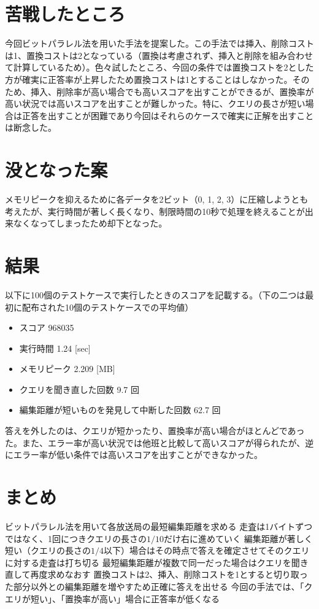 \documentclass[dvipdfmx]{jsarticle}
\begin{document}
\section{苦戦したところ}

今回ビットパラレル法を用いた手法を提案した。この手法では挿入、削除コストは1、置換コストは2となっている（置換は考慮されず、挿入と削除を組み合わせて計算しているため）。色々試したところ、今回の条件では置換コストを2とした方が確実に正答率が上昇したため置換コストは1とすることはしなかった。そのため、挿入、削除率が高い場合でも高いスコアを出すことができるが、置換率が高い状況では高いスコアを出すことが難しかった。特に、クエリの長さが短い場合は正答を出すことが困難であり今回はそれらのケースで確実に正解を出すことは断念した。

\section{没となった案}

メモリピークを抑えるために各データを2ビット（0, 1, 2, 3）に圧縮しようとも考えたが、実行時間が著しく長くなり、制限時間の10秒で処理を終えることが出来なくなってしまったため却下となった。

\section{結果}

以下に100個のテストケースで実行したときのスコアを記載する。（下の二つは最初に配布された10個のテストケースでの平均値）

\begin{itemize}
  \item スコア 968035
  \item 実行時間 1.24 [sec]
  \item メモリピーク 2.209 [MB]
  \item クエリを聞き直した回数 9.7 回
  \item 編集距離が短いものを発見して中断した回数 62.7 回
\end{itemize}

答えを外したのは、クエリが短かったり、置換率が高い場合がほとんどであった。また、エラー率が高い状況では他班と比較して高いスコアが得られたが、逆にエラー率が低い条件では高いスコアを出すことができなかった。

\section{まとめ}

ビットパラレル法を用いて各放送局の最短編集距離を求める
走査は1バイトずつではなく、1回につきクエリの長さの$1/10$だけ右に進めていく
編集距離が著しく短い（クエリの長さの$1/4$以下）場合はその時点で答えを確定させてそのクエリに対する走査は打ち切る
最短編集距離が複数で同一だった場合はクエリを聞き直して再度求めなおす
置換コストは2、挿入、削除コストを1とすると切り取った部分以外との編集距離を増やすため正確に答えを出せる
今回の手法では、「クエリが短い」、「置換率が高い」場合に正答率が低くなる
\end{document}
